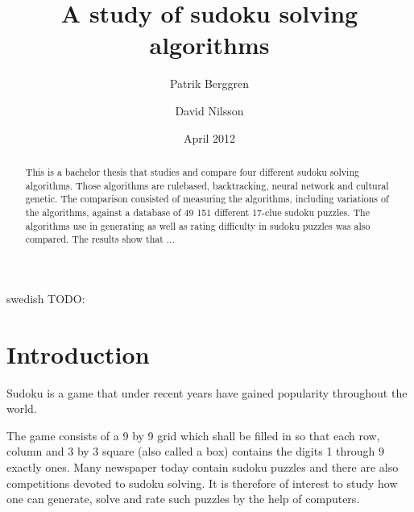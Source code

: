 \documentclass[a4paper,11pt]{kth-mag}
\title{A study of sudoku solving algorithms}
\subtitle{}
\author{Patrik Berggren \and David Nilsson}
\date{April 2012}
\begin{document}
\frontmatter
\pagestyle{empty}
\removepagenumbers
\maketitle
{}
\begin{abstract}
This is a bachelor thesis that studies and compare four different sudoku
solving algorithms.
Those algorithms are rulebased, backtracking, neural network and 
cultural genetic.
 The comparison consisted of measuring the algorithms, including
variations of the algorithms, against a database of 49 151 different 17-clue sudoku
puzzles.
The algorithms use in generating as well as rating difficulty in sudoku
puzzles was also compared.
The results show that ...
\end{abstract}
\clearpage
\begin{foreignabstract}{swedish}
TODO: 
\end{foreignabstract}
\clearpage
\tableofcontents*
\mainmatter
\pagestyle{newchap}

\chapter{Introduction}
Sudoku is a game that under recent years have gained popularity throughout the world.

The game consists of a 9 by 9 grid which shall be filled in so that each 
row, column and 3 by 3 square (also called a box) contains the digits 
1 through 9 exactly ones. 
Many newspaper today contain sudoku puzzles and there are also competitions devoted 
to sudoku solving.
It is therefore of interest to study how one can generate, 
solve and rate such puzzles by the help of computers.
\end{document}
